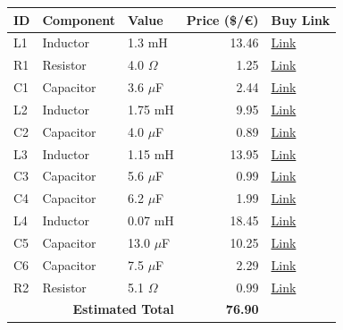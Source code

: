 \begin{table}[H]
    \centering
    \renewcommand{\arraystretch}{1.5}
    \begin{tabular}{@{}lllrl@{}}
        \toprule
        \textbf{ID} & \textbf{Component} & \textbf{Value} & \textbf{Price (\$/€)} & \textbf{Buy Link} \\
        \midrule
        L1 & Inductor & 1.3 mH & 13.46 & \href{https://www.soundimports.eu/en/jantzen-audio-000-5005.html}{Link} \\
        R1 & Resistor & 4.0 $\Omega$ & 1.25 & \href{https://www.parts-express.com/Dayton-Audio-DNR-4.0-4-Ohm-10W-Precision-Audio-Grade-Resisto-004-4}{Link} \\
        C1 & Capacitor & 3.6 $\mu$F & 2.44 & \href{https://www.soundimports.eu/en/jantzen-audio-001-0244.html}{Link} \\
        L2 & Inductor & 1.75 mH & 9.95 & \href{https://www.soundimports.eu/en/jantzen-audio-000-5586.html}{Link} \\
        C2 & Capacitor & 4.0 $\mu$F & 0.89 & \href{https://www.parts-express.com/4.0uF-100V-Non-Polarized-Capacitor-027-330}{Link} \\
        L3 & Inductor & 1.15 mH & 13.95 & \href{https://www.soundimports.eu/en/jantzen-audio-000-1625.html}{Link} \\
        C3 & Capacitor & 5.6 $\mu$F & 0.99 & \href{https://www.parts-express.com/5.6uF-100V-Non-Polarized-Capacitor-027-334}{Link} \\
        C4 & Capacitor & 6.2 $\mu$F & 1.99 & \href{https://www.parts-express.com/Dayton-Audio-PMPC-6.2-6.2uF-250V-Precision-Audio-Capacitor-027-236}{Link} \\
        L4 & Inductor & 0.07 mH & 18.45 & \href{https://www.soundimports.eu/en/jantzen-audio-000-7615.html}{Link} \\
        C5 & Capacitor & 13.0 $\mu$F & 10.25 & \href{https://www.soundimports.eu/en/audyn-q4-13-0-400.html}{Link} \\
        C6 & Capacitor & 7.5 $\mu$F & 2.29 & \href{https://www.parts-express.com/Solen-7.5uF-400V-Polypropylene-Capacitor-027-562}{Link} \\
        R2 & Resistor & 5.1 $\Omega$ & 0.99 & \href{https://www.soundimports.eu/en/jantzen-audio-002-0781.html}{Link} \\
        \midrule
        \multicolumn{3}{r}{\textbf{Estimated Total}} & \textbf{76.90} & \\
        \bottomrule
    \end{tabular}
\end{table}
